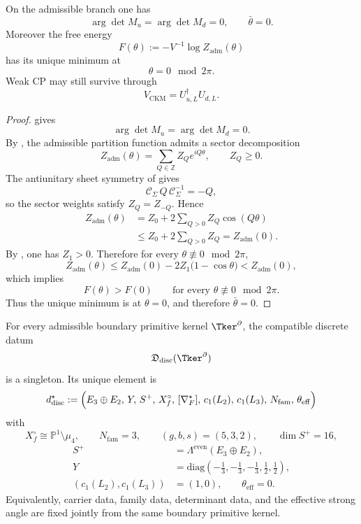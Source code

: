 \begin{theorem}
\label{thm:strong-cp-closure}
\label{thm:strong-cp-closure-positive}
On the admissible branch one has
\[
\arg\det M_u=\arg\det M_d=0,
\qquad
\bar\theta=0.
\]
Moreover the free energy
\[
F(\theta):=-V^{-1}\log Z_{\mathrm{adm}}(\theta)
\]
has its unique minimum at
\[
\theta=0\!\!\mod 2\pi.
\]
Weak CP may still survive through
\[
V_{\mathrm{CKM}}=U_{u,L}^\dagger U_{d,L}.
\]
\end{theorem}

\begin{proof}
 gives
\[
\arg\det M_u=\arg\det M_d=0.
\]
By , the admissible partition function admits a sector
decomposition
\[
Z_{\mathrm{adm}}(\theta)=\sum_{Q\in\mathbb Z} Z_Q e^{iQ\theta},
\qquad
Z_Q\ge 0.
\]
The antiunitary sheet symmetry of  gives
\[
\mathcal C_\Sigma\,Q\,\mathcal C_\Sigma^{-1}=-Q,
\]
so the sector weights satisfy $Z_Q=Z_{-Q}$. Hence
\[
\begin{aligned}
Z_{\mathrm{adm}}(\theta)
&=Z_0+2\sum_{Q>0}Z_Q\cos(Q\theta)\\
&\le Z_0+2\sum_{Q>0}Z_Q
=Z_{\mathrm{adm}}(0).
\end{aligned}
\]
By , one has $Z_1>0$. Therefore for every
$\theta\not\equiv 0\mod 2\pi$,
\[
Z_{\mathrm{adm}}(\theta)
\le
Z_{\mathrm{adm}}(0)-2Z_1\bigl(1-\cos\theta\bigr)
<
Z_{\mathrm{adm}}(0),
\]
which implies
\[
F(\theta)>F(0)
\qquad
\text{for every }\theta\not\equiv 0\mod 2\pi.
\]
Thus the unique minimum is at $\theta=0$, and therefore $\bar\theta=0$.
\end{proof}

\begin{theorem}
\label{thm:joint-discrete-admissible-sector}
\label{thm:discrete-sector-from-primitive-kernel}
For every admissible boundary primitive kernel $\Tker^\partial$, the compatible discrete datum
\[
\mathfrak D_{\mathrm{disc}}(\Tker^\partial)
\]
is a singleton. Its unique element is
\[
d^\star_{\mathrm{disc}}
:=
\Bigl(
E_3\oplus E_2,\,
Y,\,
S^+,\,
X_f^\circ,\,
[\nabla_F^\star],\,
c_1(L_2),\,
c_1(L_3),\,
N_{\mathrm{fam}},\,
\theta_{\mathrm{eff}}
\Bigr)
\]
with
\[
X_f^\circ\cong\mathbb P^1\setminus\mu_4,
\qquad
N_{\mathrm{fam}}=3,
\qquad
(g,b,s)=(5,3,2),
\qquad
\dim S^+=16,
\]
\[
\begin{aligned}
S^+&=\Lambda^{\mathrm{even}}(E_3\oplus E_2),\\
Y&=\mathrm{diag}\!\left(-\tfrac13,-\tfrac13,-\tfrac13,\tfrac12,\tfrac12\right),\\
(c_1(L_2),c_1(L_3))&=(1,0),\qquad
\theta_{\mathrm{eff}}=0.
\end{aligned}
\]
Equivalently, carrier data, family data, determinant data, and the effective strong angle are fixed
jointly from the same boundary primitive kernel.
\end{theorem}

